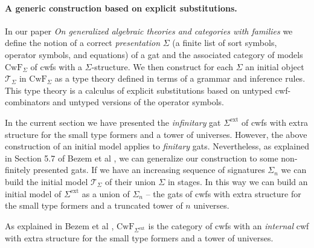 \documentclass[11pt,a4paper]{article}
\theoremstyle{plain}
\theoremstyle{definition}
\newcommand{\T}{\mathsf{T}}
\def\p{\mathrm{p}}
\def\q{\mathrm{q}}
\def\T{\mathcal{T}}
\def\CwF{\mathrm{CwF}}
\def\Sigmaext{{\Sigma^\mathrm{ext}}}
\begin{document}
\paragraph{A generic construction based on explicit substitutions.} In our paper {\em On generalized algebraic theories and categories with families} \cite{bezem:hofmann} we define the notion of a correct {\em presentation} $\Sigma$ (a finite list of sort symbols, operator symbols, and equations) of a gat and the associated category of models $\CwF_\Sigma$ of cwfs with a $\Sigma$-structure. We then construct for each $\Sigma$ an initial object $\T_\Sigma$ in $\CwF_\Sigma$ as a type theory defined in terms of a grammar and inference rules. This type theory is a calculus of explicit substitutions based on untyped cwf-combinators and untyped versions of the operator symbols.

In the current section we have presented the {\em infinitary} gat $\Sigmaext$ of cwfs with extra structure for the small type formers and a tower of universes. However, the above construction of an initial model applies to {\em finitary} gats. Nevertheless, as explained in Section 5.7 of Bezem et al  \cite{bezem:hofmann}, we can generalize our construction to some non-finitely presented gats. If we have an increasing sequence of signatures $\Sigma_n$ we can build the initial model $\T_\Sigma$ of their union $\Sigma$ in stages. In this way we can build an initial model of $\Sigmaext$ as a union of $\Sigma_n$ -- the gats of cwfs with extra structure for the small type formers and a truncated tower of $n$ universes.

As explained in Bezem et al \cite{bezem:hofmann}, $\CwF_{\Sigmaext}$ is the category of cwfs with an {\em internal} cwf with extra structure for the small type formers and a tower of universes.
\end{document}
